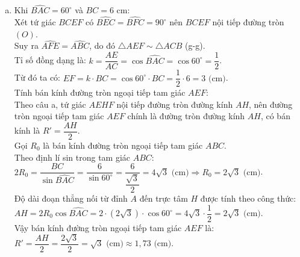 \begin{bt}
{\begin{enumerate}[a)]
    Xét $\triangle BDH$ và $\triangle BFD$ có:
    $\left\{\begin{aligned} &\widehat{DBF}\text{ là góc chung} \\ &\dfrac{BD}{BF} = \dfrac{BH}{BD}\text{ (chứng minh trên)}. \end{aligned}\right.$\\
    Do đó $\triangle BDH \sim \triangle BFD$ (c-g-c), suy ra $\widehat{BDH} = \widehat{BFD}$.
    \item Khi $\widehat{BAC} = 60^\circ$ và $BC = 6\text{ cm}$:\\
    Xét tứ giác $BCEF$ có $\widehat{BEC} = \widehat{BFC} = 90^\circ$ nên $BCEF$ nội tiếp đường tròn $(O)$.\\
    Suy ra $\widehat{AFE} = \widehat{ABC}$, do đó $\triangle AEF \sim \triangle ACB$ (g-g).\\
    Tỉ số đồng dạng là:
    $k = \dfrac{AE}{AC} = \cos \widehat{BAC} = \cos 60^\circ = \dfrac{1}{2}$.\\
    Từ đó ta có:
    $EF = k \cdot BC = \cos 60^\circ \cdot BC = \dfrac{1}{2} \cdot 6 = 3\text{ (cm)}$.\\
    Tính bán kính đường tròn ngoại tiếp tam giác $AEF$:\\
    Theo câu a, tứ giác $AEHF$ nội tiếp đường tròn đường kính $AH$, nên đường tròn ngoại tiếp tam giác $AEF$ chính là đường tròn đường kính $AH$, có bán kính là $R' = \dfrac{AH}{2}$.\\
    Gọi $R_0$ là bán kính đường tròn ngoại tiếp tam giác $ABC$.\\
    Theo định lí sin trong tam giác $ABC$:
    $2R_0 = \dfrac{BC}{\sin \widehat{BAC}} = \dfrac{6}{\sin 60^\circ} = \dfrac{6}{\dfrac{\sqrt{3}}{2}} = 4\sqrt{3}\text{ (cm)} \Rightarrow R_0 = 2\sqrt{3}\text{ (cm)}$.\\
    Độ dài đoạn thẳng nối từ đỉnh $A$ đến trực tâm $H$ được tính theo công thức:
    $AH = 2R_0 \cos \widehat{BAC} = 2 \cdot (2\sqrt{3}) \cdot \cos 60^\circ = 4\sqrt{3} \cdot \dfrac{1}{2} = 2\sqrt{3}\text{ (cm)}$.\\
    Vậy bán kính đường tròn ngoại tiếp tam giác $AEF$ là:
    $R' = \dfrac{AH}{2} = \dfrac{2\sqrt{3}}{2} = \sqrt{3}\text{ (cm)} \approx 1{,}73\text{ (cm)}$.
\end{enumerate}
}
\end{bt}

